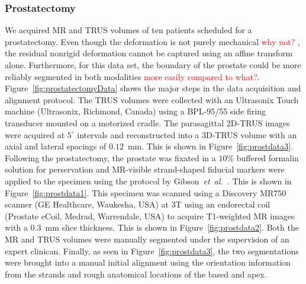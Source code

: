 \documentclass[journal]{IEEEtran}
\newcommand{\comment}[1]{\textcolor{red}{#1}}
\begin{document}
\subsubsection{Prostatectomy}\label{sec:data1}
We acquired MR and TRUS volumes of ten patients scheduled for a prostatectomy. Even though the deformation is not purely mechanical \comment{ why not? }, the residual nonrigid deformation cannot be captured using an affine transform alone. Furthermore, for this data set, the boundary of the prostate could be more reliably segmented in both modalities \comment{more easily compared to what?}. Figure~\ref{fig:prostatectomyData} shows the major steps in the data acquisition and alignment protocol. The TRUS volumes were collected with an Ultrasonix Touch machine (Ultrasonix, Richmond, Canada) using a BPL-95/55 side firing transducer mounted on a motorized cradle. The parasagittal 2D-TRUS images were acquired at $5^\circ$ intervals and reconstructed into a 3D-TRUS volume with an axial and lateral spacings of $0.12$~mm. This is shown in Figure~\ref{fig:prostdata3}. Following the prostatectomy, the prostate was fixated in a $10\%$ buffered formalin solution for perservation and MR-visible strand-shaped fiducial markers were applied to the specimen using the protocol by Gibson~\textit{et~al.}~\cite{Gibson12a}. This is shown in Figure~\ref{fig:prostdata1}. This specimen was scanned using a Discovery MR750 scanner (GE Healthcare, Waukesha, USA) at 3T using an endorectal coil (Prostate eCoil, Medrad, Warrendale, USA) to acquire T1-weighted MR images with a $0.3$~mm slice thickness. This is shown in Figure~\ref{fig:prostdata2}. Both the MR and TRUS volumes were manually segmented under the supervision of an expert clinican. Finally, as seen in Figure~\ref{fig:prostdata3}, the two segmentations were brought into a manual initial alignment using the orientation information from the strands and rough anatomical locations of the based and apex.
\end{document}
